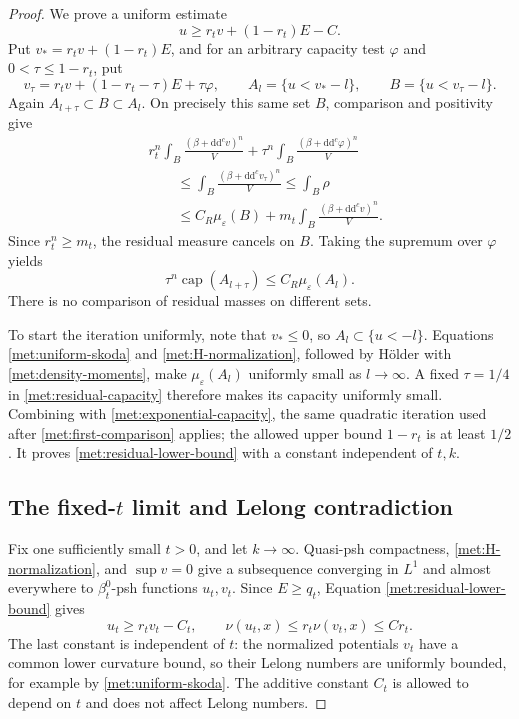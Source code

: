 \documentclass[11pt,letterpaper]{article}
\theoremstyle{definition}
\theoremstyle{remark}
\begin{document}
\begin{proof}
We prove a uniform estimate
\begin{equation}
 \label{met:residual-lower-bound}
 u\geq r_tv+(1-r_t)E-C.
\end{equation}
Put \(v_*=r_tv+(1-r_t)E\), and for an arbitrary capacity test
\(\varphi\) and \(0<\tau\leq1-r_t\), put
\[
 v_\tau=r_tv+(1-r_t-\tau)E+\tau\varphi,
 \qquad A_l=\{u<v_*-l\},
 \qquad B=\{u<v_\tau-l\}.
\]
Again \(A_{l+\tau}\subset B\subset A_l\).  On precisely this
same set \(B\), comparison and positivity give
\begin{align*}
 &r_t^n\int_B\frac{(\beta+\mathrm{d}\mathrm{d}^{c} v)^n}{V}
 +\tau^n\int_B\frac{(\beta+\mathrm{d}\mathrm{d}^{c}\varphi)^n}{V}\\
 &\qquad\leq\int_B\frac{(\beta+\mathrm{d}\mathrm{d}^{c} v_\tau)^n}{V}
 \leq\int_B\rho\\
 &\qquad\leq C_R\mu_\varepsilon(B)
       +m_t\int_B\frac{(\beta+\mathrm{d}\mathrm{d}^{c} v)^n}{V}.
\end{align*}
Since \(r_t^n\geq m_t\), the residual measure cancels on \(B\).
Taking the supremum over \(\varphi\) yields
\begin{equation}
 \label{met:residual-capacity}
 \tau^n\operatorname{cap}(A_{l+\tau})
 \leq C_R\mu_\varepsilon(A_l).
\end{equation}
There is no comparison of residual masses on different sets.

To start the iteration uniformly, note that \(v_*\leq0\), so
\(A_l\subset\{u<-l\}\).  Equations
\eqref{met:uniform-skoda} and \eqref{met:H-normalization}, followed
by H\"older with \eqref{met:density-moments}, make
\(\mu_\varepsilon(A_l)\) uniformly small as \(l\to\infty\).
A fixed \(\tau=1/4\) in \eqref{met:residual-capacity} therefore
makes its capacity uniformly small.  Combining with
\eqref{met:exponential-capacity}, the same quadratic iteration used
after \eqref{met:first-comparison} applies; the allowed upper bound
\(1-r_t\) is at least \(1/2\).  It proves
\eqref{met:residual-lower-bound} with a constant independent of
\(t,k\).

\subsection*{The fixed-\texorpdfstring{$t$}{t} limit and Lelong contradiction}

Fix one sufficiently small \(t>0\), and let \(k\to\infty\).
Quasi-psh compactness, \eqref{met:H-normalization}, and \(\sup v=0\)
give a subsequence converging in \(L^1\) and almost everywhere to
\(\beta_t^0\)-psh functions \(u_t,v_t\).  Since \(E\geq q_t\),
Equation \eqref{met:residual-lower-bound} gives
\begin{equation}
 \label{met:limit-lelong-upper}
 u_t\geq r_tv_t-C_t,
 \qquad \nu(u_t,x)\leq r_t\nu(v_t,x)\leq C r_t.
\end{equation}
The last constant is independent of \(t\): the normalized potentials
\(v_t\) have a common lower curvature bound, so their Lelong numbers
are uniformly bounded, for example by \eqref{met:uniform-skoda}.
The additive constant \(C_t\) is allowed to depend on \(t\) and
does not affect Lelong numbers.


\end{proof}
\end{document}
